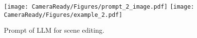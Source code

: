 \begin{figure*}
\centering
\texttt{[image: CameraReady/Figures/prompt\_2\_image.pdf]}
\texttt{[image: CameraReady/Figures/example\_2.pdf]}
\caption{Prompt of LLM for scene editing.}
\label{fig:prompt_2}
\end{figure*}